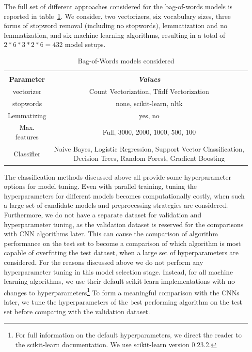 \documentclass[conference]{IEEEtran}
\begin{document}
The full set of different approaches considered for the bag-of-words models is reported in table~\ref{tababw}. We consider, two vectorizers, six vocabulary sizes, three forms of stopword removal (including no stopwords), lemmatization and no lemmatization, and six machine learning algorithms, resulting in a total of $2 * 6 * 3 * 2 * 6 = 432$ model setups.

\begin{table}[htbp]
\caption{Bag-of-Words models considered}
\begin{center}
\begin{tabular}{|c|c|}
\hline
\textbf{}&\multicolumn{1}{|c|}{\textbf{}} \\ 

\textbf{Parameter} & \textbf{\textit{Values}} \\ 
\hline
vectorizer & Count Vectorization, Tfidf Vectorization \\ 
\hline
stopwords & none, scikit-learn, nltk \\ 
\hline
Lemmatizing & yes, no \\ 
\hline
Max. features & Full, 3000, 2000, 1000, 500, 100 \\ 
\hline
Classifier & Naive Bayes, Logistic Regression, Support Vector Classification, Decision Trees, Random Forest, Gradient Boosting \\ 
\hline
\end{tabular}
\label{tababw}
\end{center}
\end{table}

The classification methods discussed above all provide some hyperparameter options for model tuning. Even with parallel training, tuning the hyperparameters for different models becomes computationally costly, when such a large set of candidate models and preprocessing strategies are considered. Furthermore, we do not have a separate dataset for validation and hyperparameter tuning, as the validation dataset is reserved for the comparisons with CNN algorithms later. This can cause the comparison of algorithm performance on the test set to become a comparison of which algorithm is most capable of overfitting the test dataset, when a large set of hyperparameters are considered. For the reasons discussed above we do not perform any hyperparameter tuning in this model selection stage. Instead, for all machine learning algorithms, we use their default scikit-learn implementations with no changes to hyperparameters\footnote{For full information on the default hyperparameters, we direct the reader to the scikit-learn documentation\cite{scikit-learn}. We use scikit-learn version 0.23.2.} To form a meaningful comparison with the CNNs later, we tune the hyperparameters of the best performing algorithm on the test set before comparing with the validation dataset.
\end{document}
